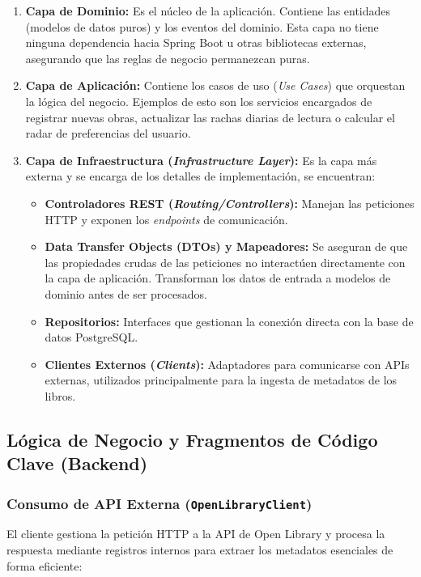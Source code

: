 \documentclass[12pt, atypical, journal]{article}
\begin{document}
\begin{enumerate}
    \item \textbf{Capa de Dominio:} Es el núcleo de la aplicación. Contiene las entidades (modelos de datos puros) y los eventos del dominio. Esta capa no tiene ninguna dependencia hacia Spring Boot u otras bibliotecas externas, asegurando que las reglas de negocio permanezcan puras.
   
    \item \textbf{Capa de Aplicación:} Contiene los casos de uso (\textit{Use Cases}) que orquestan la lógica del negocio. Ejemplos de esto son los servicios encargados de registrar nuevas obras, actualizar las rachas diarias de lectura o calcular el radar de preferencias del usuario.
   
    \item \textbf{Capa de Infraestructura (\textit{Infrastructure Layer}):} Es la capa más externa y se encarga de los detalles de implementación, se encuentran: 
    \begin{itemize}
        \item \textbf{Controladores REST (\textit{Routing/Controllers}):} Manejan las peticiones HTTP y exponen los \textit{endpoints} de comunicación.
        \item \textbf{Data Transfer Objects (DTOs) y Mapeadores:} Se aseguran de que las propiedades crudas de las peticiones no interactúen directamente con la capa de aplicación. Transforman los datos de entrada a modelos de dominio antes de ser procesados.
        \item \textbf{Repositorios:} Interfaces que gestionan la conexión directa con la base de datos PostgreSQL.
        \item \textbf{Clientes Externos (\textit{Clients}):} Adaptadores para comunicarse con APIs externas, utilizados principalmente para la ingesta de metadatos de los libros.
    \end{itemize}
\end{enumerate}

\subsection{Lógica de Negocio y Fragmentos de Código Clave (Backend)}

\subsubsection{Consumo de API Externa (\texttt{OpenLibraryClient})}
El cliente gestiona la petición HTTP a la API de Open Library y procesa la respuesta mediante registros internos para extraer los metadatos esenciales de forma eficiente:
\end{document}
